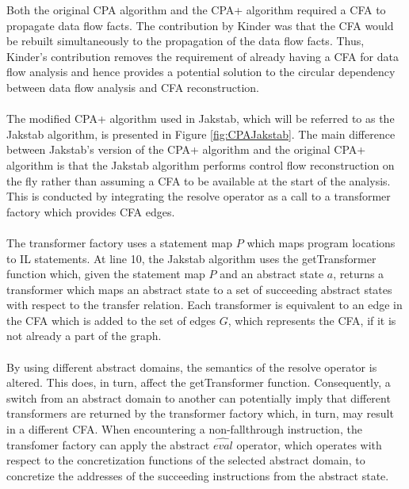 \documentclass{kththesis}
\begin{document}
\clearpage
\noindent
Both the original CPA algorithm and the CPA+ algorithm required a CFA to propagate data flow facts. The contribution by Kinder\cite{Jakstab} was that the CFA would be rebuilt simultaneously to the propagation of the data flow facts. Thus, Kinder's contribution removes the requirement of already having a CFA for data flow analysis and hence provides a potential solution to the circular dependency between data flow analysis and CFA reconstruction.
\\ \\ 
The modified CPA+ algorithm used in Jakstab, which will be referred to as the Jakstab algorithm, is presented in Figure \ref{fig:CPAJakstab}. The main difference between Jakstab's version of the CPA+ algorithm and the original CPA+ algorithm is that the Jakstab algorithm performs control flow reconstruction on the fly rather than assuming a CFA to be available at the start of the analysis. This is conducted by integrating the resolve operator as a call to a transformer factory which provides CFA edges. 
\\ \\
The transformer factory uses a statement map $P$ which maps program locations to IL statements. At line 10, the Jakstab algorithm uses the getTransformer function which, given the statement map $P$ and an abstract state $a$, returns a transformer which maps an abstract state to a set of succeeding abstract states with respect to the transfer relation. Each transformer is equivalent to an edge in the CFA which is added to the set of edges $G$, which represents the CFA, if it is not already a part of the graph.
\\ \\
By using different abstract domains, the semantics of the resolve operator is altered. This does, in turn, affect the getTransformer function. Consequently, a switch from an abstract domain to another can potentially imply that different transformers are returned by the transformer factory which, in turn, may result in a different CFA. When encountering a non-fallthrough instruction, the transfomer factory can apply the abstract $\widehat{eval}$ operator, which operates with respect to the concretization functions of the selected abstract domain, to concretize the addresses of the succeeding instructions from the abstract state.
\end{document}
